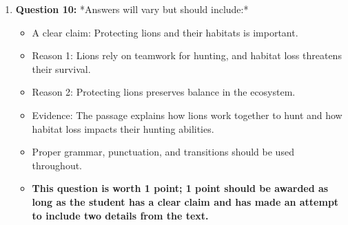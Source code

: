 \documentclass[12pt]{article}
\begin{document}
\begin{enumerate}
    \item \textbf{Question 10:}  
    *Answers will vary but should include:*
    \begin{itemize}
        \item A clear claim: Protecting lions and their habitats is important.  
        \item Reason 1: Lions rely on teamwork for hunting, and habitat loss threatens their survival.  
        \item Reason 2: Protecting lions preserves balance in the ecosystem.  
        \item Evidence: The passage explains how lions work together to hunt and how habitat loss impacts their hunting abilities.  
        \item Proper grammar, punctuation, and transitions should be used throughout.  
           \item \textbf{This question is worth 1 point; 1 point should be awarded as long as the student has a clear claim and has made an attempt to include two details from the text.}
    \end{itemize}
\end{enumerate}
\end{document}
